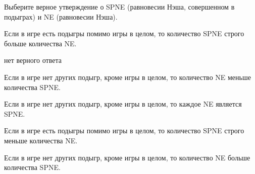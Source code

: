 
\begin{question}
Выберите верное утверждение о SPNE (равновесии Нэша, совершенном в
подыграх) и NE (равновесии Нэша).
\begin{answerlist}
  \item Если в игре есть подыгры помимо игры в целом, то количество SPNE строго
больше количества NE.
  \item нет верного ответа
  \item Если в игре нет других подыгр, кроме игры в целом, то количество NE
меньше количества SPNE.
  \item Если в игре нет других подыгр, кроме игры в целом, то каждое NE является
SPNE.
  \item Если в игре есть подыгры помимо игры в целом, то количество SPNE строго
меньше количества NE.
  \item Если в игре нет других подыгр, кроме игры в целом, то количество NE
больше количества SPNE.
\end{answerlist}
\end{question}


